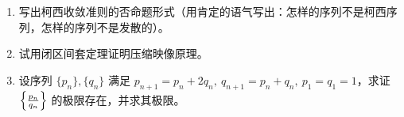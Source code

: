 \begin{exercise}{}
\begin{enumerate}
\item 写出柯西收敛准则的否命题形式（用肯定的语气写出：怎样的序列不是柯西序列，怎样的序列不是发散的）。
\item 试用闭区间套定理证明压缩映像原理。
\item 设序列 $\{p_n\}, \{q_n\}$ 满足 $p_{n+1}=p_n+2q_n,\ q_{n+1}=p_n+q_n,\ p_1=q_1=1$，求证 $\left\{\large\frac{p_n}{q_n}\right\}$ 的极限存在，并求其极限。
\end{enumerate}
\end{exercise}
